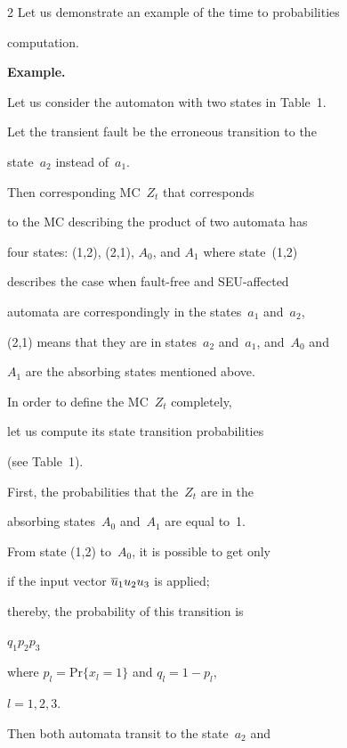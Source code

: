 \begin{multicols}{2}
Let us demonstrate an example of the time to probabilities

computation.



\medskip



\noindent

\textbf{Example.}

Let us consider the automaton with two states in Table~1.



Let the transient fault be the erroneous transition to the

state~$a_2$ instead of~$a_1$.



Then corresponding MC~$Z_t$ that corresponds

to the MC describing the product of two automata has

four states: (1,2), (2,1), $A_0$, and $A_1$ where  state~(1,2)

describes the case when fault-free and SEU-affected

automata are correspondingly in the states~$a_1$ and~$a_2$,

(2,1)  means that they  are in states~$a_2$ and~$a_1$, and~$A_0$ and

$A_1$ are the  absorbing states mentioned above.

\columnbreak



In order to define the MC~$Z_t$ completely,

let us compute its state transition probabilities

(see Table~1).





First, the probabilities that the~$Z_t$ are in the

absorbing states~$A_0$ and~$A_1$ are equal to~1.



From state (1,2) to~$A_0$, it is possible to get only

if the input vector $\overline u_1u_2u_3$ is applied;

thereby, the probability of this transition is

$q_1p_2p_3$

where $p_l=\mathrm{Pr}\{x_l =1\}$ and $q_l=1-p_l$,

$l=1,2,3$.

Then both automata transit to the state~$a_2$ and


\end{multicols}
